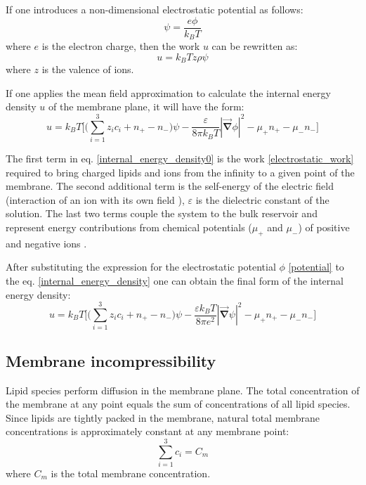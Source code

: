 If one introduces a non-dimensional electrostatic potential as follows:
\begin{equation}
 \label{potential}\psi = \frac{e\phi}{k_B T}
\end{equation}
where $e$ is the electron charge, then the work $u$ can be rewritten as:
\begin{equation}
\label{electrostatic_work}
 u=k_BT z \rho \psi
\end{equation}
where $z$ is the valence of ions.

If one applies the mean field approximation to calculate the internal energy density $u$ of the membrane plane, it will have the form:
\begin{equation}
 \label{internal_energy_density0}u=k_BT\Big[\Big(\sum_{i=1}^3 z_i c_i + n_+ - n_-\Big)\psi- \frac{\varepsilon}{8\pi k_BT}|\vec{\mathbf{\nabla}} \phi|^2 - \mu_+n_+ - \mu_-n_-\Big]
\end{equation}

The first term in eq. \eqref{internal_energy_density0} is the work \eqref{electrostatic_work} required to bring charged lipids and ions from the infinity to a given point of the membrane. The second additional term is the self-energy of the electric field (interaction of an ion with its own field \cite{Weisskopf1939}), $\varepsilon$ is the dielectric constant of the solution. The last two terms couple the system to the bulk reservoir and represent energy contributions from chemical potentials ($\mu_+$ and $\mu_-$) of positive and negative ions \cite{Borukhov1997}.

After substituting the expression for the electrostatic potential $\phi$ \eqref{potential} to the eq. \eqref{internal_energy_density} one can obtain the final form of the internal energy density:
\begin{equation}
 \label{internal_energy_density}u=k_BT\Big[\Big(\sum_{i=1}^3 z_i c_i + n_+ - n_-\Big)\psi- \frac{\varepsilon k_BT}{8\pi e^2}|\vec{\mathbf{\nabla}} \psi|^2 - \mu_+n_+ - \mu_-n_-\Big]
\end{equation}

\subsection{Membrane incompressibility}

Lipid species perform diffusion in the membrane plane. The total concentration of the membrane at any point equals the sum of concentrations of all lipid species. Since lipids are tightly packed in the membrane, natural total membrane concentrations is approximately constant at any membrane point:
\begin{equation}
\label{restriction2} \sum_{i=1}^3 c_i = C_m
\end{equation}
where $C_m$ is the total membrane concentration.

